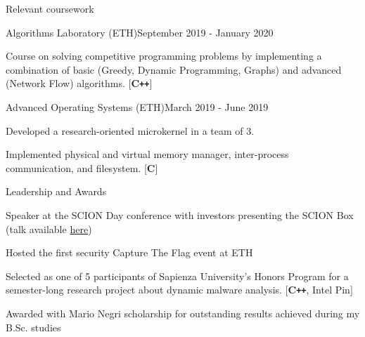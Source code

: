 \documentclass{resume}
\begin{document}

\begin{rSection}{Relevant coursework}
  \begin{rSubsection}{Algorithms Laboratory (ETH)}{September 2019 - January 2020}{}{}
  \item Course on solving competitive programming problems by implementing a combination of basic (Greedy, Dynamic Programming, Graphs) and advanced (Network Flow) algorithms. [\textbf{C\texttt{++}}]
  \end{rSubsection}
  \begin{rSubsection}{Advanced Operating Systems (ETH)}{March 2019 - June 2019}{}{}
  \item Developed a research-oriented microkernel in a team of 3.
  \item Implemented physical and virtual memory manager, inter-process communication, and filesystem. [\textbf{C}]
  \end{rSubsection}
\end{rSection}


\begin{rSection}{Leadership and Awards}

\begin{rSubsection}{}{}{}{}
\item Speaker at the SCION Day conference with investors presenting the SCION Box (talk available \href{https://video.ethz.ch/events/2019/scion/61dd8a87-3894-489d-99d3-77ca66c5ad38.html}{here})
\item Hosted the first security Capture The Flag event at ETH
\item Selected as one of 5 participants of Sapienza University's Honors Program for a semester-long research project about dynamic malware analysis. [\textbf{C\texttt{++}}, Intel Pin]
\item Awarded with Mario Negri scholarship for outstanding results achieved during my B.Sc. studies
\end{rSubsection}

\end{rSection}
\end{document}
